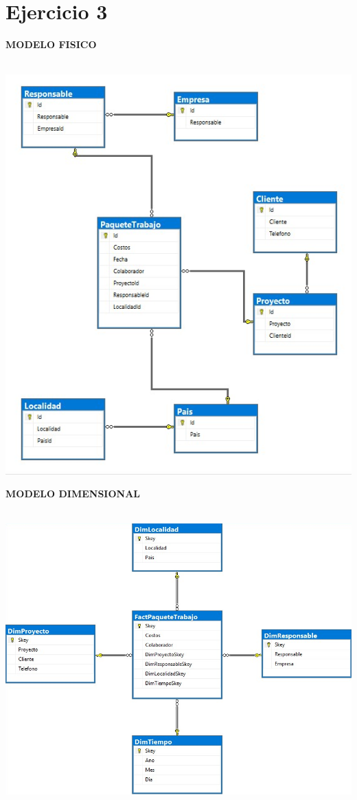 \documentclass[12pt,letterpaper]{article}
\begin{document}
\newpage
\section{Ejercicio 3}
\textbf{MODELO FISICO}\\\\
\begin{center} 
\includegraphics[width=14cm]{imagenes/e3.jpg}\\
\end{center} 
\newpage
\textbf{MODELO DIMENSIONAL}\\\\
\begin{center}
\includegraphics[width=14cm]{imagenes/dd3.png}\\
\end{center} 
\end{document}
